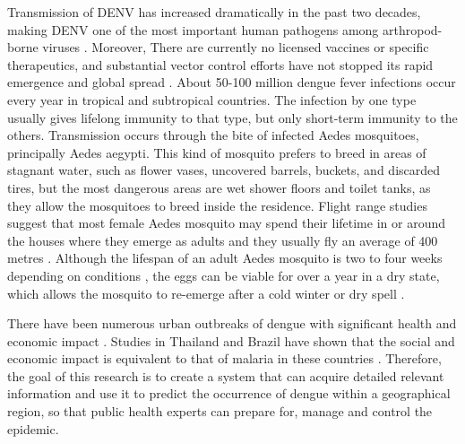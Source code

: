 \documentclass[review]{elsarticle}
\begin{document}
Transmission of DENV has increased dramatically in the past two decades, making DENV one of the most important human pathogens among arthropod-borne viruses \cite{hesse2007dengue}. Moreover, There are currently no licensed vaccines or specific therapeutics, and substantial vector control efforts have not stopped its rapid emergence and global spread \cite{tatem2006global}. About 50-100 million dengue fever infections occur every year in tropical and subtropical countries\cite{gubler2002epidemic}.  The infection by one type usually gives lifelong immunity to that type, but only short-term immunity to the others. Transmission occurs through the bite of infected Aedes mosquitoes, principally Aedes aegypti. This kind of mosquito prefers to breed in areas of stagnant water, such as flower vases, uncovered barrels, buckets, and discarded tires, but the most dangerous areas are wet shower floors and toilet tanks, as they allow the mosquitoes to breed inside the residence. Flight range studies suggest that most female Aedes mosquito may spend their lifetime in or around the houses where they emerge as adults and they usually fly an average of 400 metres \cite{whomosquito2007}. Although the lifespan of an adult Aedes mosquito is two to four weeks depending on conditions \cite{zettel2012yellow}, the eggs can be viable for over a year in a dry state, which allows the mosquito to re-emerge after a cold winter or dry spell \cite{mortimer1998aedes}.

 

There have been numerous urban outbreaks of dengue with significant health and economic impact \cite{gubler2002epidemic,gubler2004cities,anuradha19981996,vaughn2000invited}. Studies in Thailand and Brazil have shown that the social and economic impact is equivalent to that of malaria in these countries \cite{clark2005economic,luz2009disability}. Therefore, the goal of this research is to create a system that can acquire detailed relevant information and use it to predict the occurrence of dengue within a geographical region, so that public health experts can prepare for, manage and control the epidemic.  




%
	
\end{document}
